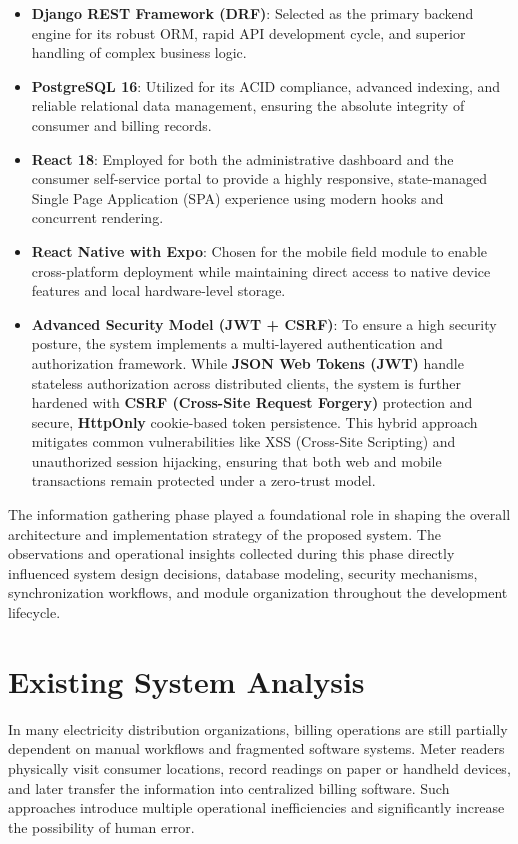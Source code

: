 \documentclass[12pt, a4paper, onecolumn]{report}
\begin{document}
\begin{itemize}
    \item \textbf{Django REST Framework (DRF)}: Selected as the primary backend engine for its robust ORM, rapid API development cycle, and superior handling of complex business logic.
    \item \textbf{PostgreSQL 16}: Utilized for its ACID compliance, advanced indexing, and reliable relational data management, ensuring the absolute integrity of consumer and billing records.
    \item \textbf{React 18}: Employed for both the administrative dashboard and the consumer self-service portal to provide a highly responsive, state-managed Single Page Application (SPA) experience using modern hooks and concurrent rendering.
    \item \textbf{React Native with Expo}: Chosen for the mobile field module to enable cross-platform deployment while maintaining direct access to native device features and local hardware-level storage.
    \item \textbf{Advanced Security Model (JWT + CSRF)}: To ensure a high security posture, the system implements a multi-layered authentication and authorization framework. While \textbf{JSON Web Tokens (JWT)} handle stateless authorization across distributed clients, the system is further hardened with \textbf{CSRF (Cross-Site Request Forgery)} protection and secure, \textbf{HttpOnly} cookie-based token persistence. This hybrid approach mitigates common vulnerabilities like XSS (Cross-Site Scripting) and unauthorized session hijacking, ensuring that both web and mobile transactions remain protected under a zero-trust model.
\end{itemize}
The information gathering phase played a foundational role in shaping the overall architecture and implementation strategy of the proposed system. The observations and operational insights collected during this phase directly influenced system design decisions, database modeling, security mechanisms, synchronization workflows, and module organization throughout the development lifecycle.

\section{Existing System Analysis}

In many electricity distribution organizations, billing operations are still partially dependent on manual workflows and fragmented software systems. Meter readers physically visit consumer locations, record readings on paper or handheld devices, and later transfer the information into centralized billing software. Such approaches introduce multiple operational inefficiencies and significantly increase the possibility of human error.
\end{document}
